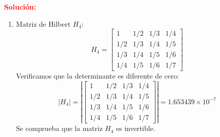 \documentclass[12pt]{article}
\begin{document}
\noindent \textcolor{red}{\bf Solución:}\\

\begin{enumerate}[label=(\alph*)]

\item Matriz de Hilbert $H_4$:
\begin{equation}
    H_4 =   \begin{bmatrix}
                 1  & 1/2 & 1/3 & 1/4 \\ 
                1/2 & 1/3 & 1/4 & 1/5 \\ 
                1/3 & 1/4 & 1/5 & 1/6 \\ 
                1/4 & 1/5 & 1/6 & 1/7
            \end{bmatrix}
\end{equation}
Verificamos que la determinante es diferente de cero:
\begin{equation}
    \left| H_4 \right| = \left|
        \begin{bmatrix}
             1  & 1/2 & 1/3 & 1/4 \\ 
            1/2 & 1/3 & 1/4 & 1/5 \\ 
            1/3 & 1/4 & 1/5 & 1/6 \\ 
            1/4 & 1/5 & 1/6 & 1/7
        \end{bmatrix}
        \right| = 1.653439 \times 10^{-7}
\end{equation}
Se comprueba que la matriz $H_4$ es invertible.


\end{enumerate}
\end{document}
